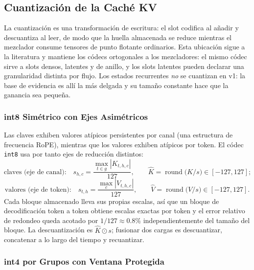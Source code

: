 \subsection{Cuantización de la Caché KV}
\label{sec:kv-quant}

La cuantización es una transformación de escritura: el slot codifica al añadir y descuantiza al leer, de modo que la huella almacenada se reduce mientras el mezclador consume tensores de punto flotante ordinarios. Esta ubicación sigue a la literatura y mantiene los códecs ortogonales a los mezcladores: el mismo códec sirve a slots densos, latentes y de anillo, y los slots latentes pueden declarar una granularidad distinta por flujo. Los estados recurrentes \emph{no} se cuantizan en v1: la base de evidencia es allí la más delgada y su tamaño constante hace que la ganancia sea pequeña.

\subsubsection{int8 Simétrico con Ejes Asimétricos}

Las claves exhiben valores atípicos persistentes por canal (una estructura de frecuencia RoPE), mientras que los valores exhiben atípicos por token. El códec \texttt{int8} usa por tanto ejes de reducción distintos:
\[
\text{claves (eje de canal):}\quad s_{h,c} = \frac{\max_{t\in g}|K_{t,h,c}|}{127},\qquad \hat{K} = \operatorname{round}\!\big(K/s\big)\in[-127,127];
\]
\[
\text{valores (eje de token):}\quad s_{t,h} = \frac{\max_{c}|V_{t,h,c}|}{127},\qquad \hat{V} = \operatorname{round}\!\big(V/s\big)\in[-127,127].
\]
Cada bloque almacenado lleva sus propias escalas, así que un bloque de decodificación token a token obtiene escalas exactas por token y el error relativo de redondeo queda acotado por $1/127\approx 0.8\%$ independientemente del tamaño del bloque. La descuantización es $\hat{K}\odot s$; fusionar dos cargas es descuantizar, concatenar a lo largo del tiempo y recuantizar.

\subsubsection{int4 por Grupos con Ventana Protegida}

